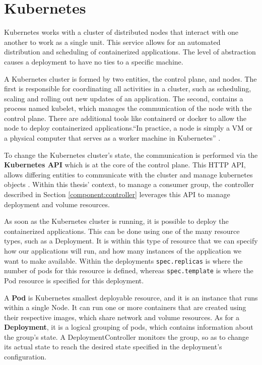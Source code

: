 \section{Kubernetes} \label{subsec:kubernetes}

Kubernetes works with a cluster of distributed nodes that interact with one
another to work as a single unit. This service allows for an automated
distribution and scheduling of containerized applications. The level of
abstraction causes a deployment to have no ties to a specific machine.

A Kubernetes cluster is formed by two entities, the control plane, and nodes. The
first is responsible for coordinating all activities in a cluster, such as
scheduling, scaling and rolling out new updates of an application. The second,
contains a process named kubelet, which manages the communication of the node
with the control plane. There are additional tools like containerd or docker to
allow the node to deploy containerized applications.``In practice, a node is
simply a VM or a physical computer that serves as a worker machine in
Kubernetes'' \cite{CreateKubeCluster}.

To change the Kubernetes cluster's state, the communication is performed via the
\textbf{Kubernetes API} which is at the core of the control plane. This HTTP
API, allows differing entities to communicate with the cluster and manage
kubernetes objects \cite{KubernetesAPI}. Within this thesis' context, to manage
a consumer group, the controller described in Section \ref{component:controller}
leverages this API to manage deployment and volume resources.

As soon as the Kubernetes cluster is running, it is possible to deploy the
containerized applications. This can be done using one of the many resource
types, such as a Deployment. It is within this type of resource that we can
specify how our applications will run, and how many instances of the application
we want to make available. Within the deployments \lstinline{spec.replicas} is
where the number of pods for this resource is defined, whereas
\lstinline{spec.template} is where the Pod resource is specified for this
deployment. 

A \textbf{Pod} is Kubernetes smallest deployable resource, and it is
an instance that runs within a single Node. It can run one or more containers
that are created using their respective images, which share network and volume
resources. As for a \textbf{Deployment}, it is a logical grouping of pods, which
contains information about the group's state. A DeploymentController monitors
the group, so as to change its actual state to reach the desired state specified
in the deployment's configuration.


